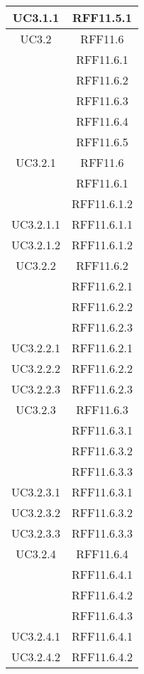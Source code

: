 \begin{longtable}{|c|c|}
\midrule
UC3.1.1
& RFF11.5.1\\

\midrule
UC3.2
& RFF11.6\\
& RFF11.6.1\\
& RFF11.6.2\\
& RFF11.6.3\\
& RFF11.6.4\\
& RFF11.6.5\\

\midrule
UC3.2.1
& RFF11.6\\
& RFF11.6.1\\
& RFF11.6.1.2\\

\midrule
UC3.2.1.1
& RFF11.6.1.1\\

\midrule
UC3.2.1.2
& RFF11.6.1.2\\

\midrule
UC3.2.2
& RFF11.6.2\\
& RFF11.6.2.1\\
& RFF11.6.2.2\\
& RFF11.6.2.3\\

\midrule
UC3.2.2.1
& RFF11.6.2.1\\

\midrule
UC3.2.2.2
& RFF11.6.2.2\\

\midrule
UC3.2.2.3
& RFF11.6.2.3\\

\midrule
UC3.2.3
& RFF11.6.3\\
& RFF11.6.3.1\\
& RFF11.6.3.2\\
& RFF11.6.3.3\\

\midrule
UC3.2.3.1
& RFF11.6.3.1\\

\midrule
UC3.2.3.2
& RFF11.6.3.2\\

\midrule
UC3.2.3.3
& RFF11.6.3.3\\

\midrule
UC3.2.4
& RFF11.6.4\\
& RFF11.6.4.1\\
& RFF11.6.4.2\\
& RFF11.6.4.3\\

\midrule
UC3.2.4.1
& RFF11.6.4.1\\

\midrule
UC3.2.4.2
& RFF11.6.4.2\\


\end{longtable}
